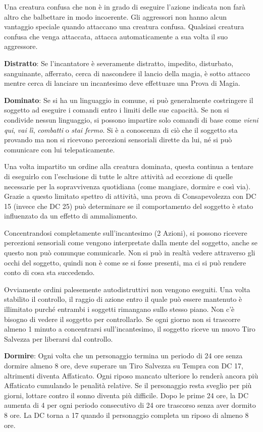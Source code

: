 \begin{multicols}{2}
\medskip

Una creatura confusa che non è in grado di eseguire l'azione indicata non farà altro che balbettare in modo incoerente. Gli aggressori non hanno alcun vantaggio speciale quando attaccano una creatura confusa. Qualsiasi creatura confusa che venga attaccata, attacca automaticamente a sua volta il suo aggressore.

\textbf{Distratto}: Se l'incantatore è severamente distratto, impedito, disturbato, sanguinante, afferrato, cerca di nascondere il lancio della magia, è sotto attacco mentre cerca di lanciare un incantesimo deve effettuare una Prova di Magia.

\textbf{Dominato}: Se si ha un linguaggio in comune, si può generalmente costringere il soggetto ad eseguire i comandi entro i limiti delle sue capacità. Se non si condivide nessun linguaggio, si possono impartire solo comandi di base come \emph{vieni qui}, \emph{vai lì}, \emph{combatti} o \emph{stai fermo}. Si è a conoscenza di ciò che il soggetto sta provando ma non si ricevono percezioni sensoriali dirette da lui, né si può comunicare con lui telepaticamente.

Una volta impartito un ordine alla creatura dominata, questa continua a tentare di eseguirlo con l'esclusione di tutte le altre attività ad eccezione di quelle necessarie per la sopravvivenza quotidiana (come mangiare, dormire e così via). Grazie a questo limitato spettro di attività, una prova di Consapevolezza con DC 15 (invece che DC 25) può determinare se il comportamento del soggetto è stato influenzato da un effetto di ammaliamento.

Concentrandosi completamente sull'incantesimo (2 Azioni), si possono ricevere percezioni sensoriali come vengono interpretate dalla mente del soggetto, anche se questo non può comunque comunicarle. Non si può in realtà vedere attraverso gli occhi del soggetto, quindi non è come se si fosse presenti, ma ci si può rendere conto di cosa sta succedendo.

Ovviamente ordini palesemente autodistruttivi non vengono eseguiti. Una volta stabilito il controllo, il raggio di azione entro il quale può essere mantenuto è illimitato purché entrambi i soggetti rimangano sullo stesso piano. Non c'è bisogno di vedere il soggetto per controllarlo. Se ogni giorno non si trascorre almeno 1 minuto a concentrarsi sull'incantesimo, il soggetto riceve un nuovo Tiro Salvezza per liberarsi dal controllo.

\textbf{Dormire}: Ogni volta che un personaggio termina un periodo di 24 ore senza dormire almeno 8 ore, deve superare un Tiro Salvezza su Tempra con DC 17, altrimenti diventa Affaticato. Ogni riposo mancato ulteriore lo renderà ancora più Affaticato cumulando le penalità relative.
Se il personaggio resta sveglio per più giorni, lottare contro il sonno diventa più difficile. Dopo le prime 24 ore, la DC aumenta di 4 per ogni periodo consecutivo di 24 ore trascorso senza aver dormito 8 ore. La DC torna a 17 quando il personaggio completa un riposo di almeno 8 ore.


\end{multicols}

